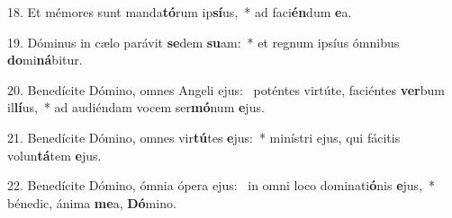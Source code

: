 18. Et mémores sunt manda\textbf{tó}rum ip\textbf{sí}us,~*  ad faci\textbf{én}dum \textbf{e}a.\

19. Dóminus in cælo parávit \textbf{se}dem \textbf{su}am:~*  et regnum ipsíus ómnibus \textbf{do}mi\textbf{ná}bitur.\

20. Benedícite Dómino, omnes Angeli ejus: \dag\  poténtes virtúte, faciéntes \textbf{ver}bum il\textbf{lí}us,~*  ad audiéndam vocem ser\textbf{mó}num \textbf{e}jus.\

21. Benedícite Dómino, omnes vir\textbf{tú}tes \textbf{e}jus:~*  minístri ejus, qui fácitis volun\textbf{tá}tem \textbf{e}jus.\

22. Benedícite Dómino, ómnia ópera ejus: \dag\  in omni loco dominati\textbf{ó}nis \textbf{e}jus,~*  bénedic, ánima \textbf{me}a, \textbf{Dó}mino.\

